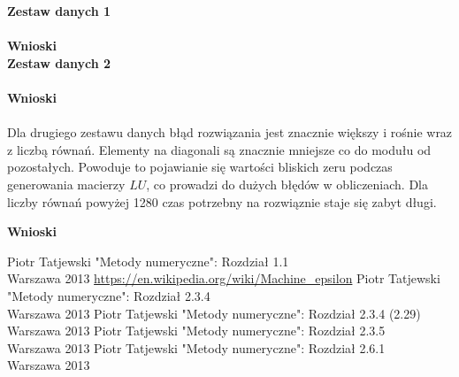 \documentclass[a4paper, 11pt]{article}
\begin{document}
\vspace{1cm}
\textbf{Zestaw danych 1}\\
\\


\vspace{2cm}
\textbf{Wnioski}\\

\textbf{Zestaw danych 2}\\
\\


\textbf{Wnioski}\\
\\
Dla drugiego zestawu danych błąd rozwiązania jest znacznie większy i rośnie wraz z liczbą równań. 
Elementy na diagonali są znacznie mniejsze co do modułu od pozostałych. Powoduje to pojawianie się wartości bliskich zeru podczas generowania macierzy $LU$, co prowadzi do dużych błędów w obliczeniach. Dla liczby równań powyżej 1280 czas potrzebny na rozwiąznie staje się zabyt długi. 





\vspace{1cm}
\textbf{Wnioski}\\




\begin{thebibliography}{99}
 Piotr Tatjewski "Metody numeryczne": Rozdział 1.1\\
Warszawa 2013
\url{https://en.wikipedia.org/wiki/Machine_epsilon}
 Piotr Tatjewski "Metody numeryczne": Rozdział 2.3.4\\
Warszawa 2013
 Piotr Tatjewski "Metody numeryczne": Rozdział 2.3.4 (2.29)\\
Warszawa 2013
 Piotr Tatjewski "Metody numeryczne": Rozdział 2.3.5\\
Warszawa 2013
 Piotr Tatjewski "Metody numeryczne": Rozdział 2.6.1\\
Warszawa 2013
\end{thebibliography}










	
\end{document}
